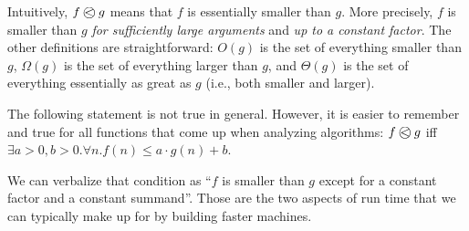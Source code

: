 Intuitively, $\Oleq{f}{g}$ means that $f$ is essentially smaller than $g$.
More precisely, $f$ is smaller than $g$ \emph{for sufficiently large arguments} and \emph{up to a constant factor}.
The other definitions are straightforward: $O(g)$ is the set of everything smaller than $g$, $\Omega(g)$ is the set of everything larger than $g$, and
$\Theta(g)$ is the set of everything essentially as great as $g$ (i.e., both smaller and larger).

\begin{remark}
The following statement is not true in general.
However, it is easier to remember and true for all functions that come up when analyzing algorithms:
$\Oleq{f}{g}$ iff $\exists a>0,b>0.\forall n. f(n)\leq a\cdot g(n)+b$.

We can verbalize that condition as ``$f$ is smaller than $g$ except for a constant factor and a constant summand''.
Those are the two aspects of run time that we can typically make up for by building faster machines.
\end{remark}

